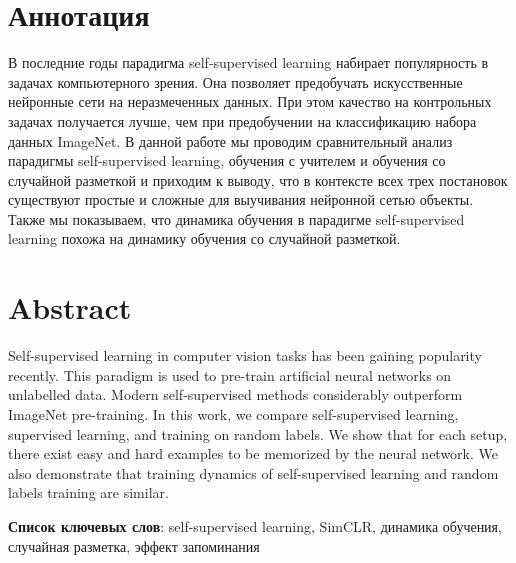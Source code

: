 \section*{Аннотация} 

В последние годы парадигма self-supervised learning набирает популярность в задачах компьютерного зрения. Она позволяет предобучать искусственные нейронные сети на неразмеченных данных. При этом качество на контрольных задачах получается лучше, чем при предобучении на классификацию набора данных ImageNet. В данной работе мы проводим сравнительный анализ парадигмы self-supervised learning, обучения с учителем и обучения со случайной разметкой и приходим к выводу, что в контексте всех трех постановок существуют простые и сложные для выучивания нейронной сетью объекты. Также мы показываем, что динамика обучения в парадигме self-supervised learning похожа на динамику обучения со случайной разметкой. 

\section*{Abstract}

Self-supervised learning in computer vision tasks has been gaining popularity recently. This paradigm is used to pre-train artificial neural networks on unlabelled data. Modern self-supervised methods considerably outperform ImageNet pre-training. In this work, we compare self-supervised learning, supervised learning, and training on random labels. We show that for each setup, there exist easy and hard examples to be memorized by the neural network. We also demonstrate that training dynamics of self-supervised learning and random labels training are similar.

\bigskip
\noindent
\textbf{Список ключевых слов}: self-supervised learning, SimCLR, динамика обучения, случайная разметка, эффект запоминания
